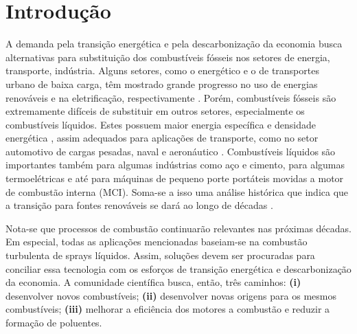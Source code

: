 \section{Introdução} \label{sec:intro}





A demanda pela transição energética e pela descarbonização da economia busca alternativas para substituição dos combustíveis fósseis nos setores de energia, transporte, indústria. 
Alguns setores, como o energético e o de transportes urbano de baixa carga, têm mostrado grande progresso no uso de energias renováveis e na eletrificação, respectivamente \cite{MasriA2021}. 
Porém, combustíveis fósseis são extremamente difíceis de substituir em outros setores, especialmente os combustíveis líquidos.
Estes possuem maior energia específica e densidade energética \cite{Bergthorson2017,Julien2017}, assim adequados para aplicações de transporte, como no setor automotivo de cargas pesadas, naval e aeronáutico \cite{MasriA2021}.
Combustíveis líquidos são importantes também para algumas indústrias como aço e cimento, para algumas termoelétricas e até para máquinas de pequeno porte portáteis movidas a motor de combustão interna (MCI).
Soma-se a isso uma análise histórica que indica que a transição para fontes renováveis se dará ao longo de décadas \cite{MasriA2021}.


Nota-se que processos de combustão continuarão relevantes nas próximas décadas.
Em especial, todas as aplicações mencionadas baseiam-se na combustão turbulenta de sprays líquidos.
Assim, soluções devem ser procuradas para conciliar essa tecnologia com os esforços de transição energética e descarbonização da economia.
A comunidade científica busca, então, três caminhos: \textbf{(i)} desenvolver novos combustíveis; \textbf{(ii)} desenvolver novas origens para os mesmos combustíveis; \textbf{(iii)} melhorar a eficiência dos motores a combustão e reduzir a formação de poluentes.

